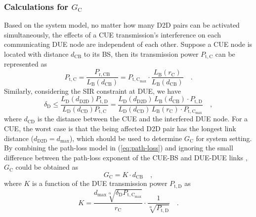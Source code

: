 \documentclass[journal, 10pt]{IEEEtran}
\begin{document}
\subsubsection{Calculations for $G_\mathrm{C}$}
Based on the system model, no matter how many D2D pairs can be
activated simultaneously, the effects of a CUE transmission's
interference on each communicating DUE node are independent of each
other. Suppose a CUE node is located with distance $d_{\mathrm{CB}}$
to its BS, then its transmission power $P_\mathrm{t,C}$ can be
represented as 
\begin{equation}
	P_\mathrm{t,C} = \frac{P_\mathrm{r,CB}}{L_\mathrm{B}(d_\mathrm{CB}) } 
	  = P_{\mathrm{t,C_{\max}}}  \cdot \frac{L_\mathrm{B}(r_\mathrm{C})}
	  {L_\mathrm{B}(d_\mathrm{CB})} \quad.
\end{equation}
Similarly, considering the SIR constraint at DUE, we have
\begin{equation}
\delta_\mathrm{D} \leq \frac{L_\mathrm{D} (d_\mathrm{D2D}) P_\mathrm{t,D} }
{ L_\mathrm{D}(d_\mathrm{CD}) P_\mathrm{t,C} } = 
\frac{L_\mathrm{D}(d_\mathrm{D2D}) \, L_\mathrm{B}(d_\mathrm{CB}) \cdot P_\mathrm{t,D} }
{L_\mathrm{D}(d_\mathrm{CD}) \, L_\mathrm{B}(r_\mathrm{C}) \cdot P_{\mathrm{t, C_{\max}}} } \quad,
\end{equation}
where $d_\mathrm{CD}$ is the distance between the CUE and the
interfered DUE node. For a CUE, the worst case is that the being
affected D2D pair has the longest link distance ($d_\mathrm{D2D} =
d_{\max}$), which should be used to determine $G_\mathrm{C}$ for
system setting. By combining the path-loss model in
(\ref{eq:path-loss}) and ignoring the small difference between the
path-loss exponent of the CUE-BS and DUE-DUE links \cite{Min:11TWC-b},
$G_\mathrm{C}$ could be obtained as 
\begin{equation} \label{eq:R2}
G_\mathrm{C} = K\cdot d_{\mathrm{CB}} \quad,
\end{equation}
where $K$ is a function of the DUE transmission power $P_\mathrm{t,D}$ as 
\begin{equation}\label{eq:K}
K = \frac{d_{\max} \sqrt[\alpha]{\delta_{\mathrm{D}} P_{\mathrm{t, C_{\max}} }}}
{ r_{\mathrm{C}}} \cdot \frac{1}{\sqrt[\alpha]{P_\mathrm{t,D}  } }\quad. 
\end{equation}
\end{document}

